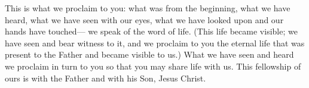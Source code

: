 \lettrine[lines=3]{T}{}his is what we proclaim to you:
what was from the beginning,
what we have heard,
what we have seen with our eyes,
what we have looked upon
and our hands have touched—
we speak of the word of life.
(This life became visible; we have seen and bear witness to it, and we proclaim to you the eternal life that was present to the Father and became visible to us.)
What we have seen and heard
we proclaim in turn to you
so that you may share life with us.
This fellowship of ours is with the Father
and with his Son, Jesus Christ.
